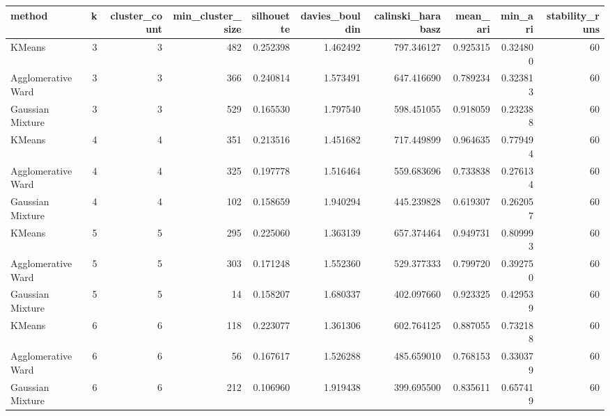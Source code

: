 \begin{tabular}{lrrrrrrrrr}
\toprule
method & k & cluster_count & min_cluster_size & silhouette & davies_bouldin & calinski_harabasz & mean_ari & min_ari & stability_runs \\
\midrule
KMeans & 3 & 3 & 482 & 0.252398 & 1.462492 & 797.346127 & 0.925315 & 0.324800 & 60 \\
Agglomerative Ward & 3 & 3 & 366 & 0.240814 & 1.573491 & 647.416690 & 0.789234 & 0.323813 & 60 \\
Gaussian Mixture & 3 & 3 & 529 & 0.165530 & 1.797540 & 598.451055 & 0.918059 & 0.232388 & 60 \\
KMeans & 4 & 4 & 351 & 0.213516 & 1.451682 & 717.449899 & 0.964635 & 0.779494 & 60 \\
Agglomerative Ward & 4 & 4 & 325 & 0.197778 & 1.516464 & 559.683696 & 0.733838 & 0.276134 & 60 \\
Gaussian Mixture & 4 & 4 & 102 & 0.158659 & 1.940294 & 445.239828 & 0.619307 & 0.262057 & 60 \\
KMeans & 5 & 5 & 295 & 0.225060 & 1.363139 & 657.374464 & 0.949731 & 0.809993 & 60 \\
Agglomerative Ward & 5 & 5 & 303 & 0.171248 & 1.552360 & 529.377333 & 0.799720 & 0.392750 & 60 \\
Gaussian Mixture & 5 & 5 & 14 & 0.158207 & 1.680337 & 402.097660 & 0.923325 & 0.429539 & 60 \\
KMeans & 6 & 6 & 118 & 0.223077 & 1.361306 & 602.764125 & 0.887055 & 0.732188 & 60 \\
Agglomerative Ward & 6 & 6 & 56 & 0.167617 & 1.526288 & 485.659010 & 0.768153 & 0.330379 & 60 \\
Gaussian Mixture & 6 & 6 & 212 & 0.106960 & 1.919438 & 399.695500 & 0.835611 & 0.657419 & 60 \\
\bottomrule
\end{tabular}
